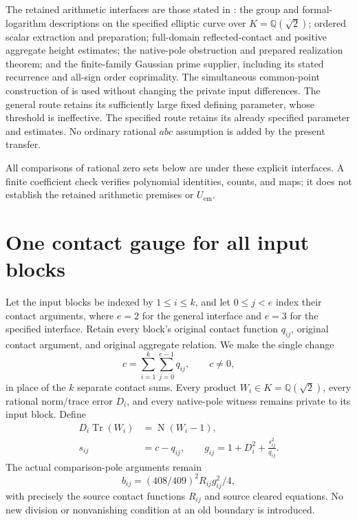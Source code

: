 \documentclass[11pt]{article}
\newcommand{\Q}{\mathbb Q}\newcommand{\Z}{\mathbb Z}
\begin{document}
The retained arithmetic interfaces are those stated in
\cite{gate,scalar,common}: the group and formal-logarithm descriptions on
the specified elliptic curve over \(K=\Q(\sqrt2)\); ordered scalar
extraction and preparation; full-domain reflected-contact and positive
aggregate height estimates; the native-pole obstruction and prepared
realization theorem; and the finite-family Gaussian prime supplier,
including its stated recurrence and all-sign order coprimality. The
simultaneous common-point construction of \cite{common,crt} is used
without changing the private input differences. The general route
retains its sufficiently large fixed defining parameter, whose
threshold is ineffective. The specified route retains its already
specified parameter and estimates. No ordinary rational \(abc\)
assumption is added by the present transfer.

All comparisons of rational zero sets below are under these explicit
interfaces. A finite coefficient check verifies polynomial identities,
counts, and maps; it does not establish the retained arithmetic
premises or \(U_{\mathrm{em}}\).

\section{One contact gauge for all input blocks}
\label{sec:global-contact-gauge}

Let the input blocks be indexed by \(1\le i\le k\), and let
\(0\le j<e\) index their contact arguments, where \(e=2\)
for the general interface and \(e=3\) for the specified
interface. Retain every block's original contact function
\(q_{ij}\), original contact argument, and original aggregate
relation. We make the single change
\begin{equation}\label{eq:global-contact-sum}
                    c=\sum_{i=1}^{k}\sum_{j=0}^{e-1}q_{ij},
                    \qquad c\ne0,
\end{equation}
in place of the \(k\) separate contact sums. Every product
\(W_i\in K=\mathbb Q(\sqrt2)\), every rational norm/trace
error \(D_i\), and every native-pole witness remains private
to its input block. Define
\begin{equation}\label{eq:global-gates}
 \begin{split}
 D_i\operatorname{Tr}(W_i)&=\operatorname{N}(W_i-1),\\
 s_{ij}&=c-q_{ij},\qquad
 g_{ij}=1+D_i^2+\frac{s_{ij}^2}{q_{ij}} .
 \end{split}
\end{equation}
The actual comparison-pole arguments remain
\begin{equation}\label{eq:global-pole}
               b_{ij}=(408/409)^2 R_{ij}g_{ij}^2/4,
\end{equation}
with precisely the source contact functions \(R_{ij}\)
and source cleared equations. No new division or
nonvanishing condition at an old boundary is introduced.
\end{document}
